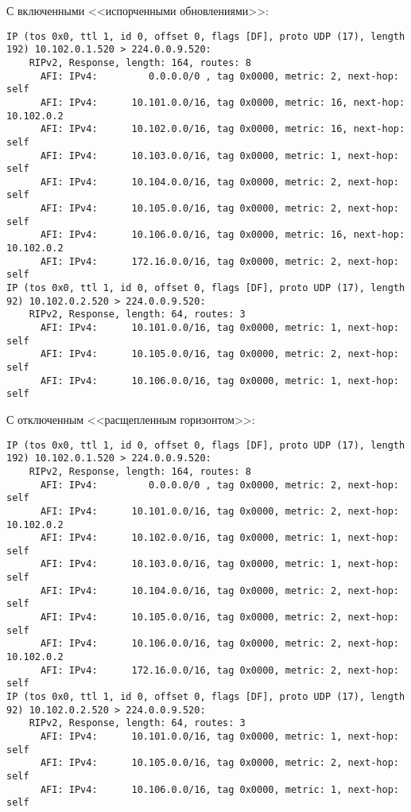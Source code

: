 \documentclass[a4paper,12pt]{article}
\begin{document}
С включенными <<испорченными обновлениями>>:
\begin{Verbatim}
IP (tos 0x0, ttl 1, id 0, offset 0, flags [DF], proto UDP (17), length 192) 10.102.0.1.520 > 224.0.0.9.520: 
	RIPv2, Response, length: 164, routes: 8
	  AFI: IPv4:         0.0.0.0/0 , tag 0x0000, metric: 2, next-hop: self
	  AFI: IPv4:      10.101.0.0/16, tag 0x0000, metric: 16, next-hop: 10.102.0.2
	  AFI: IPv4:      10.102.0.0/16, tag 0x0000, metric: 16, next-hop: self
	  AFI: IPv4:      10.103.0.0/16, tag 0x0000, metric: 1, next-hop: self
	  AFI: IPv4:      10.104.0.0/16, tag 0x0000, metric: 2, next-hop: self
	  AFI: IPv4:      10.105.0.0/16, tag 0x0000, metric: 2, next-hop: self
	  AFI: IPv4:      10.106.0.0/16, tag 0x0000, metric: 16, next-hop: 10.102.0.2
	  AFI: IPv4:      172.16.0.0/16, tag 0x0000, metric: 2, next-hop: self
IP (tos 0x0, ttl 1, id 0, offset 0, flags [DF], proto UDP (17), length 92) 10.102.0.2.520 > 224.0.0.9.520: 
	RIPv2, Response, length: 64, routes: 3
	  AFI: IPv4:      10.101.0.0/16, tag 0x0000, metric: 1, next-hop: self
	  AFI: IPv4:      10.105.0.0/16, tag 0x0000, metric: 2, next-hop: self
	  AFI: IPv4:      10.106.0.0/16, tag 0x0000, metric: 1, next-hop: self
\end{Verbatim}

С отключенным <<расщепленным горизонтом>>:
\begin{Verbatim}
IP (tos 0x0, ttl 1, id 0, offset 0, flags [DF], proto UDP (17), length 192) 10.102.0.1.520 > 224.0.0.9.520: 
	RIPv2, Response, length: 164, routes: 8
	  AFI: IPv4:         0.0.0.0/0 , tag 0x0000, metric: 2, next-hop: self
	  AFI: IPv4:      10.101.0.0/16, tag 0x0000, metric: 2, next-hop: 10.102.0.2
	  AFI: IPv4:      10.102.0.0/16, tag 0x0000, metric: 1, next-hop: self
	  AFI: IPv4:      10.103.0.0/16, tag 0x0000, metric: 1, next-hop: self
	  AFI: IPv4:      10.104.0.0/16, tag 0x0000, metric: 2, next-hop: self
	  AFI: IPv4:      10.105.0.0/16, tag 0x0000, metric: 2, next-hop: self
	  AFI: IPv4:      10.106.0.0/16, tag 0x0000, metric: 2, next-hop: 10.102.0.2
	  AFI: IPv4:      172.16.0.0/16, tag 0x0000, metric: 2, next-hop: self
IP (tos 0x0, ttl 1, id 0, offset 0, flags [DF], proto UDP (17), length 92) 10.102.0.2.520 > 224.0.0.9.520: 
	RIPv2, Response, length: 64, routes: 3
	  AFI: IPv4:      10.101.0.0/16, tag 0x0000, metric: 1, next-hop: self
	  AFI: IPv4:      10.105.0.0/16, tag 0x0000, metric: 2, next-hop: self
	  AFI: IPv4:      10.106.0.0/16, tag 0x0000, metric: 1, next-hop: self
\end{Verbatim}
\end{document}
